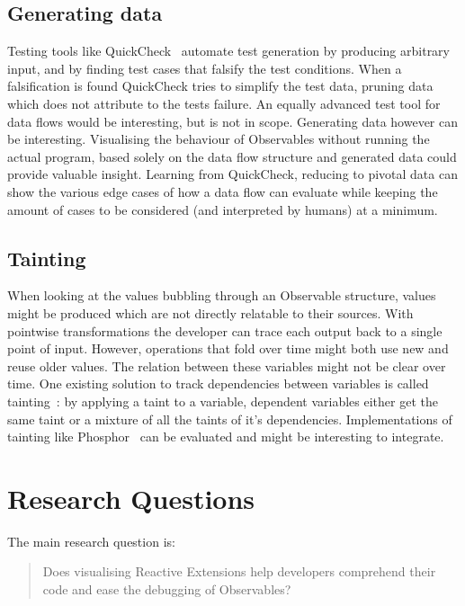 \subsection{Generating data}%
\label{sec:gen-data} Testing tools like QuickCheck~\cite{quickcheck}
automate test generation by producing arbitrary input, and by finding
test cases that falsify the test conditions.  When a falsification is
found QuickCheck tries to simplify the test data, pruning data which
does not attribute to the tests failure.  An equally advanced test tool
for data flows would be interesting, but is not in scope.  Generating
data however can be interesting.  Visualising the behaviour of
Observables without running the actual program, based solely on the data
flow structure and generated data could provide valuable insight.
Learning from QuickCheck, reducing to pivotal data can show the various
edge cases of how a data flow can evaluate while keeping the amount of
cases to be considered (and interpreted by humans) at a minimum.

\subsection{Tainting} When looking at the values bubbling through an
Observable structure, values might be produced which are not directly
relatable to their sources.  With pointwise transformations the
developer can trace each output back to a single point of input.
However, operations that fold over time might both use new and reuse
older values.  The relation between these variables might not be clear
over time.  One existing solution to track dependencies between
variables is called tainting~\cite{bell2015dynamic}:  by applying a
taint to a variable, dependent variables either get the same taint or a
mixture of all the taints of it's dependencies.  Implementations of
tainting like Phosphor~\cite{bell2014phosphor} can be evaluated and
might be interesting to integrate.

\section{Research Questions}%
\label{sec:questions} The main research question is:

\begin{quotation}
    \noindent
    Does visualising Reactive Extensions help developers comprehend
    their code and ease the debugging of Observables?
\end{quotation}

